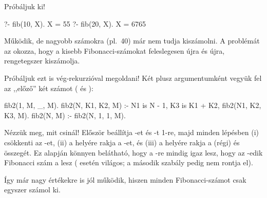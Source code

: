 Próbáljuk ki!
\begin{query}
?- fib(10, X).
X = 55
?- fib(20, X).
X = 6765
\end{query}
Működik, de nagyobb számokra (pl.~40) már nem tudja
kiszámolni. A problémát az okozza, hogy a kisebb
Fibonacci-számokat feleslegesen újra és újra,
rengetegszer kiszámolja.

Próbáljuk ezt is vég-rekurzióval megoldani! Két
plusz argumentumként vegyük fel az ,,előző'' két
számot ( és ):
\begin{program}
fib2(1, M, _, M).
fib2(N, K1, K2, M) :-
    N1 is N - 1, K3 is K1 + K2,
    fib2(N1, K2, K3, M).
fib2(N, M) :- fib2(N, 1, 1, M).
\end{program}
Nézzük meg, mit csinál! Először beállítja -et
és -t 1-re, majd minden lépésben (i)
csökkenti az -et, (ii) a  helyére rakja
a -et, és (iii) a  helyére rakja a
(régi)  és  összegét. Ez alapján
könnyen belátható, hogy a -re
mindig igaz lesz, hogy az -edik Fibonacci
szám a  lesz ( esetén világos;
a második szabály pedig nem rontja el).

Így már nagy értékekre is jól működik, hiszen minden
Fibo\-nacci-számot csak egyszer számol ki.

